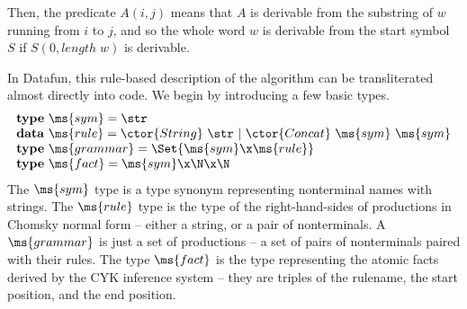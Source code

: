 Then, the predicate $A(i,j)$ means that $A$ is derivable from the
substring of $w$ running from $i$ to $j$, and so the whole word $w$ is
derivable from the start symbol $S$ if $S(0, \mathit{length}\;w)$ is
derivable.

In Datafun, this rule-based description of the algorithm can be
transliterated almost directly into code. We begin by introducing a
few basic types.
\[\begin{array}{l}
\mathbf{type}~\ms{sym} = \str\\
\mathbf{data}~\ms{rule} = \ctor{String}~\str ~|~ \ctor{Concat}~\ms{sym}~\ms{sym}\\
\mathbf{type}~\ms{grammar} = \Set{\ms{sym} \x \ms{rule}}\\
\mathbf{type}~\ms{fact} = \ms{sym} \x \N \x \N\\
\end{array}\]
The $\ms{sym}$ type is a type synonym representing nonterminal names
with strings. The $\ms{rule}$ type is the type of the right-hand-sides
of productions in Chomsky normal form -- either a string, or a pair of
nonterminals. A $\ms{grammar}$ is just a set of productions -- a set
of pairs of nonterminals paired with their rules. The type $\ms{fact}$
is the type representing the atomic facts derived by the CYK inference
system -- they are triples of the rulename, the start position, and
the end position.

